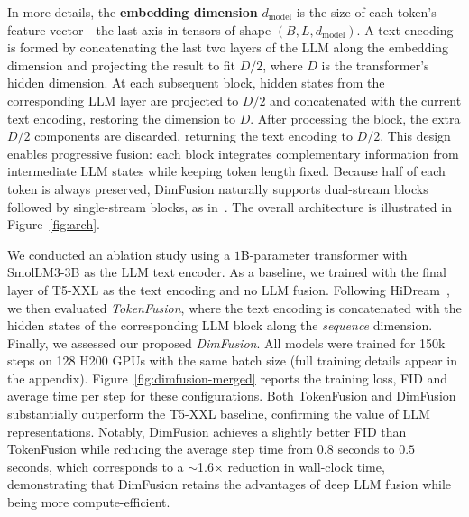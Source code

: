 In more details, the \textbf{embedding dimension} $d_{\text{model}}$ is the size of each token’s feature vector—the last axis in tensors of shape $(B, L, d_{\text{model}})$. A text encoding is formed by concatenating the last two layers of the LLM along the embedding dimension and projecting the result to fit $D/2$, where $D$ is the transformer’s hidden dimension. At each subsequent block, hidden states from the corresponding LLM layer are projected to $D/2$ and concatenated with the current text encoding, restoring the dimension to $D$. After processing the block, the extra $D/2$ components are discarded, returning the text encoding to $D/2$. This design enables progressive fusion: each block integrates complementary information from intermediate LLM states while keeping token length fixed. Because half of each token is always preserved, DimFusion naturally supports dual-stream blocks followed by single-stream blocks, as in~\cite{esser2024scaling}. 
The overall architecture is illustrated in Figure~\ref{fig:arch}. 













We conducted an ablation study using a $1$B-parameter transformer with SmolLM3-3B as the LLM text encoder. 
As a baseline, we trained with the final layer of T5-XXL as the text encoding and no LLM fusion. 
Following HiDream~\cite{cai2025hidream}, we then evaluated \emph{TokenFusion}, where the text encoding is concatenated with the hidden states of the corresponding LLM block along the \emph{sequence} dimension. 
Finally, we assessed our proposed \emph{DimFusion}. 
All models were trained for 150k steps on 128 H200 GPUs with the same batch size (full training details appear in the appendix).
Figure~\ref{fig:dimfusion-merged} reports the training loss, FID and average time per step for these configurations. Both TokenFusion and DimFusion substantially outperform the T5-XXL baseline, confirming the value of LLM representations. 
Notably, DimFusion achieves a slightly better FID than TokenFusion while reducing the average step time from $0.8$ seconds to $0.5$ seconds, which corresponds to a $\sim$1.6× reduction in wall-clock time, demonstrating that DimFusion retains the advantages of deep LLM fusion while being more compute-efficient.





% 




